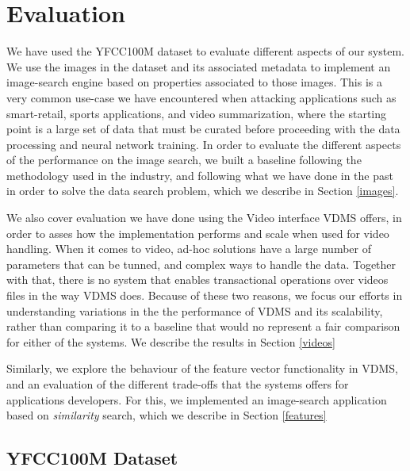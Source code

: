 \section{Evaluation}
\label{eval}

We have used the YFCC100M dataset to evaluate different aspects of our system.
We use the images in the dataset and its associated metadata to implement
an image-search engine based on properties associated to those images.
This is a very common use-case we have encountered when attacking
applications such as smart-retail, sports applications, and video summarization,
where the starting point is a large set of data that must be curated
before proceeding with the data processing and neural network training.
In order to evaluate the different aspects of the performance on the
image search, we built a baseline following the methodology used in the industry, and following what we have done in the past in order to solve
the data search problem, which we describe in Section \ref{images}.

We also cover evaluation we have done using the Video interface VDMS offers,
in order to asses how the implementation performs and scale when used
for video handling.
When it comes to video, ad-hoc solutions have a large number of parameters that
can be tunned, and complex ways to handle the data. Together with that,
there is no system that enables transactional operations over videos files
in the way VDMS does. Because of these two reasons, we focus our efforts in
understanding variations in the the performance of VDMS and its scalability,
rather than comparing it to a baseline that would no represent a fair comparison
for either of the systems. We describe the results in Section \ref{videos}

Similarly, we explore the behaviour of the feature vector functionality in VDMS,
and an evaluation of the different trade-offs that the systems offers for
applications developers. For this, we implemented an image-search application
based on \textit{similarity} search, which we describe in Section \ref{features}


\subsection{YFCC100M Dataset}
\label{dataset}

